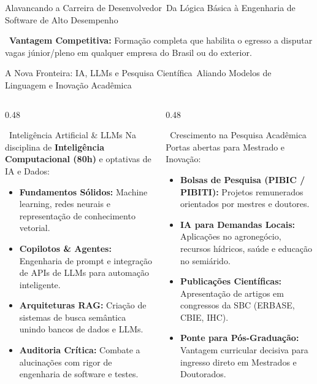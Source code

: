 \begin{frame}{Alavancando a Carreira de Desenvolvedor}{\faRocket\ Da Lógica Básica à Engenharia de Software de Alto Desempenho}
  \vspace{0.15cm}
  \begin{statcard}
    \scriptsize \textcolor{TechDark}{\faAward\ \textbf{Vantagem Competitiva:} Formação completa que habilita o egresso a disputar vagas júnior/pleno em qualquer empresa do Brasil ou do exterior.}
  \end{statcard}
\end{frame}

\begin{frame}{A Nova Fronteira: IA, LLMs e Pesquisa Científica}{\faBrain\ Aliando Modelos de Linguagem e Inovação Acadêmica}
  \begin{columns}[t]
    \begin{column}{0.48\textwidth}
      \begin{purplecard}{\faRobot\ Inteligência Artificial \& LLMs}
        \scriptsize
        Na disciplina de \textbf{Inteligência Computacional (80h)} e optativas de IA e Dados:
        \begin{itemize}\setlength{\itemsep}{0.15em}
          \item \textbf{Fundamentos Sólidos:} Machine learning, redes neurais e representação de conhecimento vetorial.
          \item \textbf{Copilotos \& Agentes:} Engenharia de prompt e integração de APIs de LLMs para automação inteligente.
          \item \textbf{Arquiteturas RAG:} Criação de sistemas de busca semântica unindo bancos de dados e LLMs.
          \item \textbf{Auditoria Crítica:} Combate a alucinações com rigor de engenharia de software e testes.
        \end{itemize}
      \end{purplecard}
    \end{column}
    
    \begin{column}{0.48\textwidth}
      \begin{greencard}{\faMicroscope\ Crescimento na Pesquisa Acadêmica}
        \scriptsize
        Portas abertas para Mestrado e Inovação:
        \begin{itemize}\setlength{\itemsep}{0.15em}
          \item \textbf{Bolsas de Pesquisa (PIBIC / PIBITI):} Projetos remunerados orientados por mestres e doutores.
          \item \textbf{IA para Demandas Locais:} Aplicações no agronegócio, recursos hídricos, saúde e educação no semiárido.
          \item \textbf{Publicações Científicas:} Apresentação de artigos em congressos da SBC (ERBASE, CBIE, IHC).
          \item \textbf{Ponte para Pós-Graduação:} Vantagem curricular decisiva para ingresso direto em Mestrados e Doutorados.
        \end{itemize}
      \end{greencard}
    \end{column}
  \end{columns}
\end{frame}
